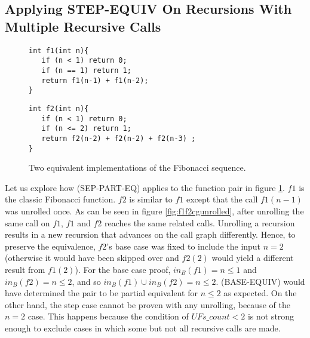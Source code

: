 \subsection{Applying STEP-EQUIV On Recursions With Multiple Recursive Calls}
\label{sec:appstepmrc}
\begin{figure}[h]
\begin{center}
\begin{minipage}{7 cm}
\begin{lstlisting}
int f1(int n){
   if (n < 1) return 0;
   if (n == 1) return 1; 
   return f1(n-1) + f1(n-2);
}
\end{lstlisting}
\end{minipage}
\begin{minipage}{7 cm}
\begin{lstlisting}
int f2(int n){
   if (n < 1) return 0;
   if (n <= 2) return 1;
   return f2(n-2) + f2(n-2) + f2(n-3) ;
}
\end{lstlisting}
\end{minipage}
\caption{Two equivalent implementations of the Fibonacci sequence.}
\label{fig:f1f2}
\end{center}
\end{figure}
Let us explore how (SEP-PART-EQ) applies to the function pair in figure \ref{fig:f1f2}.
$f1$ is the classic Fibonacci function. $f2$ is similar to $f1$ except that the call  $f1(n-1)$ was unrolled once. As can be seen in figure \ref{fig:f1f2cgunrolled}, after unrolling the same call on $f1$, $f1$ and $f2$ reaches the same related calls. Unrolling a recursion results in a new recursion that advances on the call graph differently. Hence, to preserve the equivalence, $f2$'s base case was fixed to include the input $n=2$ (otherwise it would have been skipped over and $f2(2)$ would yield a different result from $f1(2)$). 
For the base case proof, $in_B(f1) = {n \leq 1}$ and  $in_B(f2) = {n \leq 2}$, and so $in_B(f1) \cup in_B(f2) = {n \leq 2} $. (BASE-EQUIV) would have determined the pair to be partial equivalent for ${n \leq 2}$ as expected. On the other hand, the step case cannot be proven with any unrolling, because of the $n=2$ case. This happens because the condition of $UFs\_count < 2$ is not strong enough to exclude cases in which some but not all recursive calls are made.

